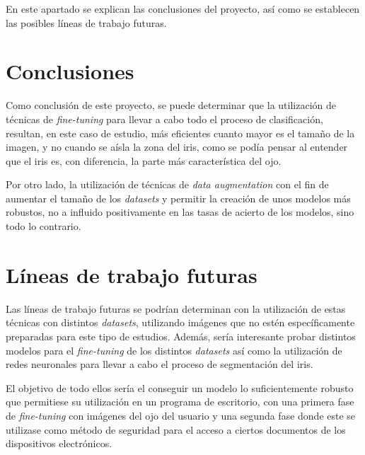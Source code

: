  \label{capitulo7}

En este apartado se explican las conclusiones del proyecto, así como se establecen las posibles líneas de trabajo futuras.

\section{Conclusiones}

Como conclusión de este proyecto, se puede determinar que la utilización de técnicas de \textit{fine-tuning} para llevar a cabo todo el proceso de clasificación,
resultan, en este caso de estudio, más eficientes cuanto mayor es el tamaño de la imagen, y no cuando se aísla la zona del iris, como se podía pensar al entender
que el iris es, con diferencia, la parte más característica del ojo. 

Por otro lado, la utilización de técnicas de \textit{data augmentation} con el fin de aumentar el tamaño de los \textit{datasets} y permitir la creación de unos modelos más robustos,
no a influido positivamente en las tasas de acierto de los modelos, sino todo lo contrario.


\section{Líneas de trabajo futuras}

Las líneas de trabajo futuras se podrían determinan con la utilización de estas técnicas con distintos \textit{datasets}, utilizando imágenes que no estén específicamente preparadas
para este tipo de estudios. Además, sería interesante probar distintos modelos para el \textit{fine-tuning} de los distintos \textit{datasets} así como la utilización de redes neuronales
para llevar a cabo el proceso de segmentación del iris.

El objetivo de todo ellos sería el conseguir un modelo lo suficientemente robusto
que permitiese su utilización en un programa de escritorio, con una primera fase de \textit{fine-tuning} con imágenes del ojo del usuario y una segunda fase donde este 
se utilizase como método de seguridad para el acceso a ciertos documentos de los dispositivos electrónicos.